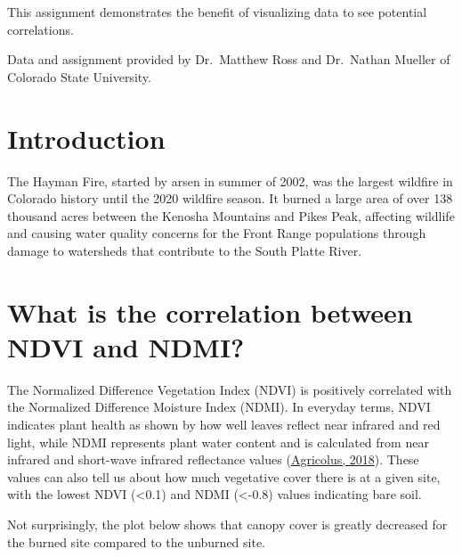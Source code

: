 \documentclass[
]{book}
\begin{document}
This assignment demonstrates the benefit of visualizing data to see potential correlations.

Data and assignment provided by Dr.~Matthew Ross and Dr.~Nathan Mueller of Colorado State University.

\hypertarget{introduction}{%
\section{Introduction}\label{introduction}}

The Hayman Fire, started by arsen in summer of 2002, was the largest wildfire in Colorado history until the 2020 wildfire season. It burned a large area of over 138 thousand acres between the Kenosha Mountains and Pikes Peak, affecting wildlife and causing water quality concerns for the Front Range populations through damage to watersheds that contribute to the South Platte River.

\hypertarget{what-is-the-correlation-between-ndvi-and-ndmi}{%
\section{What is the correlation between NDVI and NDMI?}\label{what-is-the-correlation-between-ndvi-and-ndmi}}

The Normalized Difference Vegetation Index (NDVI) is positively correlated with the Normalized Difference Moisture Index (NDMI). In everyday terms, NDVI indicates plant health as shown by how well leaves reflect near infrared and red light, while NDMI represents plant water content and is calculated from near infrared and short-wave infrared reflectance values (\href{https://www.agricolus.com/en/vegetation-indices-ndvi-ndmi/}{Agricolus, 2018}). These values can also tell us about how much vegetative cover there is at a given site, with the lowest NDVI (\textless0.1) and NDMI (\textless-0.8) values indicating bare soil.

Not surprisingly, the plot below shows that canopy cover is greatly decreased for the burned site compared to the unburned site.
\end{document}
